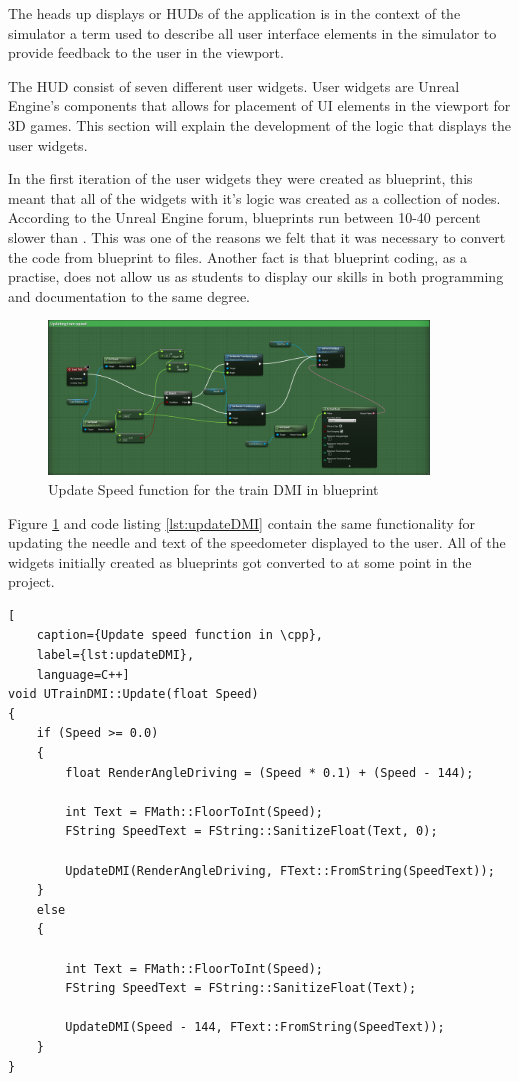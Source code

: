 The heads up displays or HUDs of the application is in the context of the simulator a term used to describe all user interface elements in the simulator to provide feedback to the user in the viewport. 

The HUD consist of seven different user widgets. User widgets are Unreal Engine's components that allows for placement of UI elements in the viewport for 3D games. This section will explain the development of the logic that displays the user widgets.

In the first iteration of the user widgets they were created as \gls{blueprint}, this meant that all of the widgets with it's logic was created as a collection of nodes. According to the Unreal Engine forum, blueprints run between 10-40 percent slower than \cpp \cite{ue4_blueprint_forums_2016}. This was one of the reasons we felt that it was necessary to convert the code from blueprint to \cpp files. Another fact is that blueprint coding, as a practise, does not allow us as students to display our skills in both programming and documentation to the same degree.

\begin{figure}[H]
    \centerline{\includegraphics[width=0.9\textwidth]{figures/TrainDMISpeedFunc.PNG}}
    \caption{Update Speed function for the train DMI in blueprint}
    \label{fig:train_dmi}
\end{figure}

Figure \ref{fig:train_dmi} and code listing \ref{lst:updateDMI} contain the same functionality for updating the needle and text of the speedometer displayed to the user. All of the widgets initially created as blueprints got converted to \cpp at some point in the project.

\begin{lstlisting}[
    caption={Update speed function in \cpp},
    label={lst:updateDMI},
    language=C++]
void UTrainDMI::Update(float Speed)
{
	if (Speed >= 0.0)
	{
		float RenderAngleDriving = (Speed * 0.1) + (Speed - 144);

		int Text = FMath::FloorToInt(Speed);
		FString SpeedText = FString::SanitizeFloat(Text, 0);

		UpdateDMI(RenderAngleDriving, FText::FromString(SpeedText));
	}
	else
	{

		int Text = FMath::FloorToInt(Speed);
		FString SpeedText = FString::SanitizeFloat(Text);

		UpdateDMI(Speed - 144, FText::FromString(SpeedText));
	}
}
\end{lstlisting}

